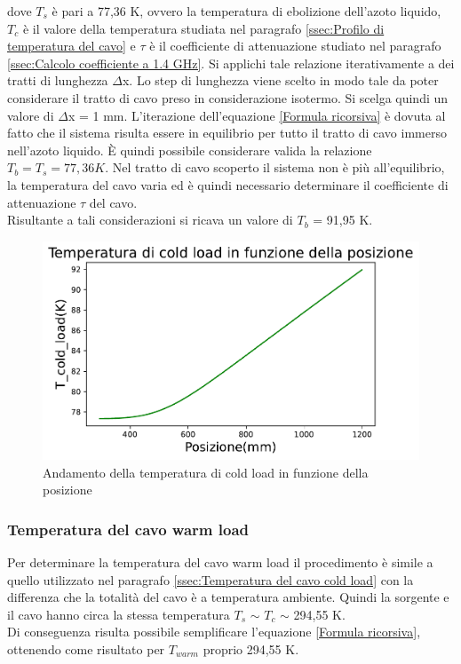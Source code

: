dove $T_{s}$ è pari a 77,36 K, ovvero la temperatura di ebolizione dell'azoto liquido, $T_{c}$ è il valore della temperatura studiata nel paragrafo \ref{ssec:Profilo di temperatura del cavo} e $\tau$ è il coefficiente di attenuazione studiato nel paragrafo \ref{ssec:Calcolo coefficiente a 1.4 GHz}.
Si applichi tale relazione iterativamente a dei tratti di lunghezza $\Delta$x. Lo step di lunghezza viene scelto in modo tale da poter considerare il tratto di cavo preso in considerazione isotermo. Si scelga quindi un valore di $\Delta$x = 1 mm.
L'iterazione dell'equazione \eqref{Formula ricorsiva} è dovuta al fatto che il sistema risulta essere in equilibrio per tutto il tratto di cavo immerso nell'azoto liquido. \`E quindi possibile considerare valida la relazione $T_{b} = T_{s} = 77,36 K$. Nel tratto di cavo scoperto il sistema non è più all'equilibrio, la temperatura del cavo varia ed è quindi necessario determinare il coefficiente di attenuazione $\tau$ del cavo.\\
Risultante a tali considerazioni si ricava un valore di $T_{b}$ = 91,95 K.

\begin{figure}[H]
	\centering
	\includegraphics[scale=0.8]{Temperatura_vs_posizione.pdf}
	\caption{Andamento della temperatura di cold load in funzione della posizione}
    	\label{fig:Temperatura_vs_posizione}
\end{figure}


\subsubsection{Temperatura del cavo warm load}
\label{ssec:Temperatura del cavo warm load}

Per determinare la temperatura del cavo warm load il procedimento è simile a quello utilizzato nel paragrafo \ref{ssec:Temperatura del cavo cold load} con la differenza che la totalità del cavo è a temperatura ambiente. Quindi la sorgente e il cavo hanno circa la stessa temperatura $T_{s}$ $\sim$ $T_{c}$ $\sim$ 294,55 K.\\
Di conseguenza risulta possibile semplificare l'equazione \eqref{Formula ricorsiva}, ottenendo come risultato per $ T_{warm} $ proprio 294,55 K.



